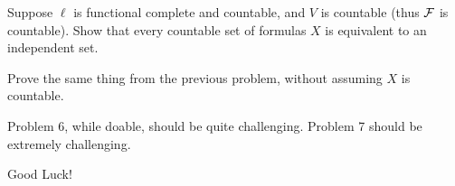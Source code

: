 \bprob

    Suppose $\ell$ is functional complete and countable, and $V$ is countable (thus ${\cal F}$ is
    countable).
    Show that every countable set of formulas $X$ is equivalent to an independent set.

\eprob

\bprob

    Prove the same thing from the previous problem, without assuming $X$ is countable.

\eprob

Problem 6, while doable, should be quite challenging.
Problem 7 should be extremely challenging.

\bigskip

\centerline{Good Luck!}

\bye

